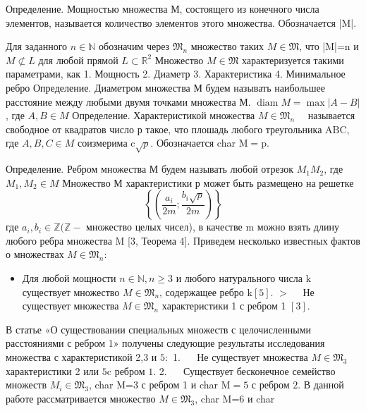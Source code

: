 \documentclass[a4paper,openbib]{article}
\renewcommand{\geq}{\geqslant}
\begin{document}
Определение. Мощностью множества М, состоящего из конечного
числа элементов, называется количество элементов этого множества. Обозначается |M|.

Для заданного $n \in \mathbb{N}$ обозначим через $\mathfrak{M}_{n}$ множество таких $M \in \mathfrak{M}$, что |M|=n и $M \not \subset L$ для любой прямой $L \subset \mathbb{R}^{2}$ Множество $M \in \mathfrak{M}$ характеризуется такими параметрами, как
1. Мощность
2. Диаметр
3. Характеристика
4. Минимальное ребро Определение. Диаметром множества М будем называть наибольшее расстояние между любыми двумя точками множества М.
$\operatorname{diam} M=\max |A-B|$, где $A, B \in M$
Определение. Характеристикой множества $M \in \mathfrak{M}_{n} \quad$ называется свободное от квадратов число р такое, что плошадь любого треугольника $\mathrm{ABC}$, где $A, B, C \in M$ соизмерима $\mathrm{c} \sqrt{p} .$ Обозначается char $\mathrm{M}=\mathrm{p} .$

Определение. Ребром множества М будем называть любой отрезок $M_{1} M_{2}$, где $M_{1}, M_{2} \in M$
Множество М характеристики р может быть размещено на решетке
$$
\left\{\left(\frac{a_{i}}{2 m} ; \frac{b_{i} \sqrt{p}}{2 m}\right)\right\}
$$
где $a_{i}, b_{i} \in \mathbb{Z}(\mathbb{Z}-$ множество целых чисел), в качестве $\mathrm{m}$ можно взять длину любого ребра множества $\mathrm{M}$ [3, Теорема 4].
Приведем несколько известных фактов о множествах $M \in \mathfrak{M}_{n}:$
\begin{itemize}
- Для любого $n \in \mathbb{N}, n \geq 3$ выполнено $\mathfrak{M}_{n} \neq \emptyset$ [3, Теорема 2].
$>\quad \mathrm{C}$ возрастанием мощности диаметр возрастает не менее чем линейно [4,6].
- Для любой мощности $n \in \mathbb{N}, n \geq 3$ и любого свободного от квадратов числа р существует множество $M \in \mathfrak{M}_{n}$ такое, что char $\mathrm{M}=\mathrm{p}[3,$, Teopema 5 ].

\item Для любой мощности $n \in \mathbb{N}, n \geq 3$ и любого натурального числа $\mathrm{k}$ существует множество $M \in \mathfrak{M}_{n}$, содержащее ребро $\mathrm{k}[5] .$
$>\quad$ Не существует множества $M \in \mathfrak{M}_{n}$ характеристики 1 с ребром 1
$[3] .$
\end{itemize}
В статье «О существовании специальных множеств с целочисленными расстояниями с ребром 1» получены следующие результаты исследования множества с характеристикой 2,3 и $5:$
1. $\quad$ Не существует множества $M \in \mathfrak{M}_{3}$ характеристики 2 или $5 \mathrm{c}$ ребром $1 .$
2. $\quad$ Существует бесконечное семейство множеств $M_{i} \in \mathfrak{M}_{3}$, char M=3
с ребром 1 и char $\mathrm{M}=5$ с ребром $2 .$ В данной работе рассматривается множество $M \in \mathfrak{M}_{3}$, char M=6 и char
\end{document}
